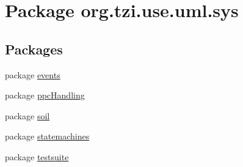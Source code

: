 \hypertarget{namespaceorg_1_1tzi_1_1use_1_1uml_1_1sys}{\section{Package org.\-tzi.\-use.\-uml.\-sys}
\label{namespaceorg_1_1tzi_1_1use_1_1uml_1_1sys}
}
\subsection*{Packages}
\begin{DoxyCompactItemize}
\item 
package \hyperlink{namespaceorg_1_1tzi_1_1use_1_1uml_1_1sys_1_1events}{events}
\item 
package \hyperlink{namespaceorg_1_1tzi_1_1use_1_1uml_1_1sys_1_1ppc_handling}{ppc\-Handling}
\item 
package \hyperlink{namespaceorg_1_1tzi_1_1use_1_1uml_1_1sys_1_1soil}{soil}
\item 
package \hyperlink{namespaceorg_1_1tzi_1_1use_1_1uml_1_1sys_1_1statemachines}{statemachines}
\item 
package \hyperlink{namespaceorg_1_1tzi_1_1use_1_1uml_1_1sys_1_1testsuite}{testsuite}
\end{DoxyCompactItemize}
